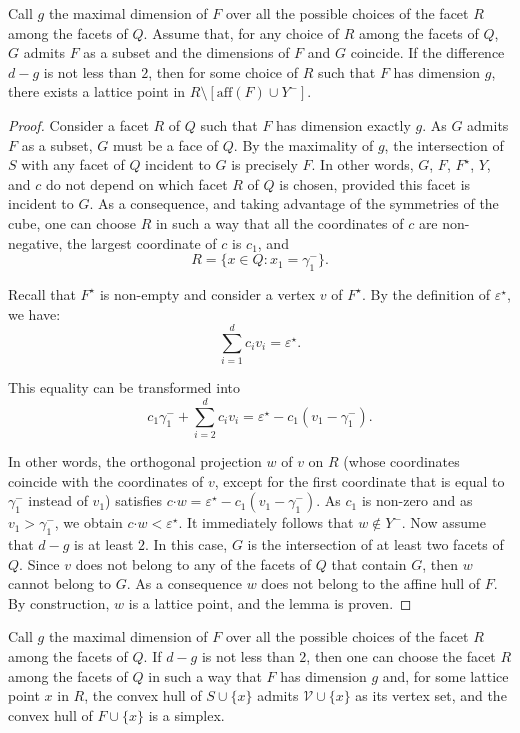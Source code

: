 \begin{lemma}\label{Lem.EA}
Call $g$ the maximal dimension of $F$ over all the possible choices of the facet $R$ among the facets of $Q$. Assume that, for any choice of $R$ among the facets of $Q$, $G$ admits $F$ as a subset and the dimensions of $F$ and $G$ coincide. If the difference $d-g$ is not less than $2$, then for some choice of $R$ such that $F$ has dimension $g$, there exists a lattice point in $R\mathord{\setminus}[\mathrm{aff}(F)\cup{Y^-}]$.
\end{lemma}
\begin{proof}
Consider a facet $R$ of $Q$ such that $F$ has dimension exactly $g$. As $G$ admits $F$ as a subset, $G$ must be a face of $Q$. By the maximality of $g$, the intersection of $S$ with any facet of $Q$ incident to $G$ is precisely $F$. In other words, $G$, $F$, $F^\star$, $Y$, and $c$ do not depend on which facet $R$ of $Q$ is chosen, provided this facet is incident to $G$. As a consequence, and taking advantage of the symmetries of the cube, one can choose $R$ in such a way that all the coordinates of $c$ are non-negative, the largest coordinate of $c$ is $c_1$, and
$$
R=\{x\in{Q}:x_1=\gamma_1^-\}\mbox{.}
$$

Recall that $F^\star$ is non-empty and consider a vertex $v$ of $F^\star$. By the definition of $\varepsilon^\star$, we have:
$$
\sum_{i=1}^dc_iv_i=\varepsilon^\star\mbox{.}
$$

This equality can be transformed into
$$
c_1\gamma_1^-+\sum_{i=2}^dc_iv_i=\varepsilon^\star-c_1(v_1-\gamma_1^-)\mbox{.}
$$

In other words, the orthogonal projection $w$ of $v$ on $R$ (whose coordinates coincide with the coordinates of $v$, except for the first coordinate that is equal to $\gamma_1^-$ instead of $v_1$) satisfies $c\mathord{\cdot}w=\varepsilon^\star-c_1(v_1-\gamma_1^-)$. As $c_1$ is non-zero and as $v_1>\gamma_1^-$, we obtain $c\mathord{\cdot}w<\varepsilon^\star$. It immediately follows that $w\not\in{Y^-}$. Now assume that $d-g$ is at least $2$. In this case, $G$ is the intersection of at least two facets of $Q$. Since $v$ does not belong to any of the facets of $Q$ that contain $G$, then $w$ cannot belong to $G$. As a consequence $w$ does not belong to the affine hull of $F$. By construction, $w$ is a lattice point, and the lemma is proven.
\end{proof}

\begin{theorem}\label{thm.add}
Call $g$ the maximal dimension of $F$ over all the possible choices of the facet $R$ among the facets of $Q$. If $d-g$ is not less than $2$, then one can choose the facet $R$ among the facets of $Q$ in such a way that $F$ has dimension $g$ and, for some lattice point $x$ in $R$, the convex hull of $S\cup\{x\}$ admits $\mathcal{V}\cup\{x\}$ as its vertex set, and the convex hull of $F\cup\{x\}$ is a simplex.
\end{theorem}

